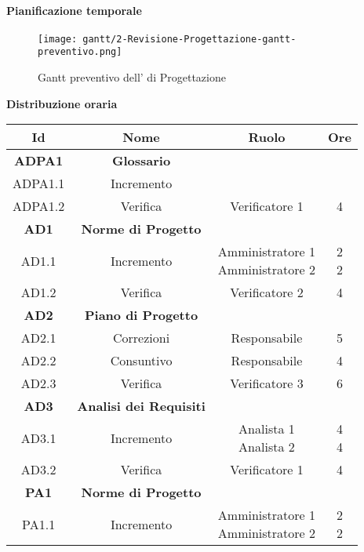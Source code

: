 \documentclass{scalatekids-article}
\begin{document}
\newpage
\paragraph{Pianificazione temporale}
\begin{figure}[H]
  \texttt{[image: gantt/2-Revisione-Progettazione-gantt-preventivo.png]}
  \caption{Gantt preventivo dell' di Progettazione}
\end{figure}

\newpage
\textbf{Distribuzione oraria}
\scriptsize
\begin{center}
  \begin{tabular}{| c | c | c | c |}
    \hline
    \textbf{Id} & \textbf{Nome} & \textbf{Ruolo} & \textbf{Ore}\\
    \hline
    \textbf{ADPA1} & \textbf{Glossario} & &\\
    \hline
    ADPA1.1 & Incremento &  &\\
    \hline
    ADPA1.2 & Verifica & Verificatore 1 & 4\\
    \hline
    \textbf{AD1} & \textbf{Norme di Progetto} & &\\
    \hline
    AD1.1 & Incremento & \multiLineCell[t]{Amministratore 1\\Amministratore 2} & \multiLineCell[t]{2\\2}\\
    \hline
    AD1.2 & Verifica & Verificatore 2 & 4\\
    \hline
    \textbf{AD2} & \textbf{Piano di Progetto} & &\\
    \hline
    AD2.1 & Correzioni & Responsabile & 5\\
    \hline
    AD2.2 & Consuntivo & Responsabile & 4\\
    \hline
    AD2.3 & Verifica & Verificatore 3 & 6\\
    \hline
    \textbf{AD3} & \textbf{Analisi dei Requisiti} & &\\
    \hline
    AD3.1 & Incremento & \multiLineCell[t]{Analista 1\\Analista 2} & \multiLineCell[t]{4\\4}\\
    \hline
    AD3.2 & Verifica & Verificatore 1 & 4\\
    \hline
    \textbf{PA1} & \textbf{Norme di Progetto} & &\\
    \hline
    PA1.1 & Incremento & \multiLineCell[t]{Amministratore 1\\Amministratore 2} & \multiLineCell[t]{2\\2}\\

\end{tabular}
\end{center}
\end{document}
